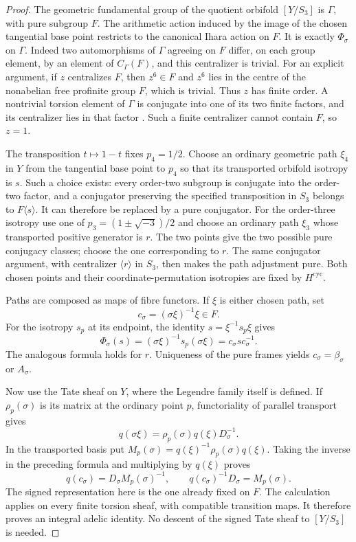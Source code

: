 \begin{proof}
The geometric fundamental group of the quotient orbifold
$[Y/S_3]$ is $\Gamma$, with pure subgroup $F$.
The arithmetic action induced by the image of the chosen
tangential base point restricts to the canonical Ihara action
on $F$.  It is exactly $\Phi_\sigma$ on $\Gamma$.
Indeed two automorphisms of $\Gamma$ agreeing on $F$ differ,
on each group element, by an element of $C_\Gamma(F)$, and this
centralizer is trivial.  For an explicit argument, if $z$ centralizes
$F$, then $z^6\in F$ and $z^6$ lies in the centre of the nonabelian
free profinite group $F$, which is trivial.  Thus $z$ has finite
order.  A nontrivial torsion element of $\Gamma$ is conjugate into
one of its two finite factors, and its centralizer lies in that
factor \cite{HerfortRibes1985}.  Such a finite centralizer cannot
contain $F$, so $z=1$.

The transposition $t\mapsto1-t$ fixes $p_4=1/2$.
Choose an ordinary geometric path $\xi_4$ in $Y$ from the
tangential base point to $p_4$ so that its transported orbifold
isotropy is $s$.  Such a choice exists: every order-two subgroup
is conjugate into the order-two factor, and a conjugator preserving
the specified transposition in $S_3$ belongs to $F\langle s\rangle$.
It can therefore be replaced by a pure conjugator.
For the order-three isotropy use one of
$p_3=(1\pm\sqrt{-3})/2$ and choose an ordinary path $\xi_3$
whose transported positive generator is $r$.
The two points give the two possible pure conjugacy classes;
choose the one corresponding to $r$.  The same conjugator
argument, with centralizer $\langle r\rangle$ in $S_3$, then
makes the path adjustment pure.  Both chosen points and their
coordinate-permutation isotropies are fixed by $H^{\mathrm{cyc}}$.

Paths are composed as maps of fibre functors.  If $\xi$ is either
chosen path, set
\[
 c_\sigma=(\sigma\xi)^{-1}\xi\in F.
\]
For the isotropy $s_p$ at its endpoint, the identity
$s=\xi^{-1}s_p\xi$ gives
\[
 \Phi_\sigma(s)=(\sigma\xi)^{-1}s_p(\sigma\xi)
                        =c_\sigma s c_\sigma^{-1}.
\]
The analogous formula holds for $r$.  Uniqueness of the pure
frames yields $c_\sigma=\beta_\sigma$ or $A_\sigma$.

Now use the Tate sheaf on $Y$, where the Legendre family itself
is defined.  If $\rho_p(\sigma)$ is its matrix at the ordinary
point $p$, functoriality of parallel transport gives
\[
 q(\sigma\xi)=\rho_p(\sigma)q(\xi)D_\sigma^{-1}.
\]
In the transported basis put
$M_p(\sigma)=q(\xi)^{-1}\rho_p(\sigma)q(\xi)$.
Taking the inverse in the preceding formula and multiplying by
$q(\xi)$ proves
\begin{equation}
 q(c_\sigma)=D_\sigma M_p(\sigma)^{-1},\qquad
 q(c_\sigma)^{-1}D_\sigma=M_p(\sigma).
 \label{eq:adelic-path-order}
\end{equation}
The signed representation here is the one already fixed on $F$.
The calculation applies on every finite torsion sheaf, with
compatible transition maps.  It therefore proves an integral
adelic identity.  No descent of the signed Tate sheaf to
$[Y/S_3]$ is needed.


\end{proof}

